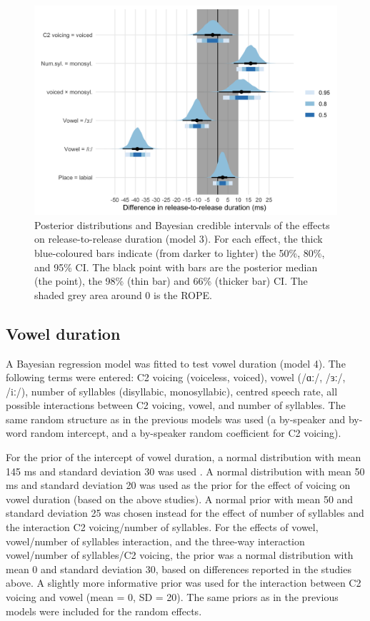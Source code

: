 \documentclass[12pt,a4paper,]{article}
\begin{document}
\begin{figure}
\includegraphics[width=\linewidth]{2019-english-rr_files/figure-latex/Figure1-1} \caption{Posterior distributions and Bayesian credible intervals of the effects on release-to-release duration (model 3). For each effect, the thick blue-coloured bars indicate (from darker to lighter) the 50\%, 80\%, and 95\% CI. The black point with bars are the posterior median (the point), the 98\% (thin bar) and 66\% (thicker bar) CI. The shaded grey area around 0 is the ROPE.}\label{f:Figure1}
\end{figure}

\hypertarget{vowel-duration}{%
\subsection{Vowel duration}\label{vowel-duration}}

\label{s:vow}

A Bayesian regression model was fitted to test vowel duration (model 4).
The following terms were entered: C2 voicing (voiceless, voiced), vowel
(/ɑː/, /ɜː/, /iː/), number of syllables (disyllabic, monosyllabic),
centred speech rate, all possible interactions between C2 voicing,
vowel, and number of syllables. The same random structure as in the
previous models was used (a by-speaker and by-word random intercept, and
a by-speaker random coefficient for C2 voicing).

For the prior of the intercept of vowel duration, a normal distribution
with mean 145 ms and standard deviation 30 was used
\citep{heffner1937, house1953, peterson1960, sharf1962, chen1970, klatt1973, davis1989, laeufer1992, ko2018}.
A normal distribution with mean 50 ms and standard deviation 20 was used
as the prior for the effect of voicing on vowel duration (based on the
above studies). A normal prior with mean 50 and standard deviation 25
was chosen instead for the effect of number of syllables and the
interaction C2 voicing/number of syllables. For the effects of vowel,
vowel/number of syllables interaction, and the three-way interaction
vowel/number of syllables/C2 voicing, the prior was a normal
distribution with mean 0 and standard deviation 30, based on differences
reported in the studies above. A slightly more informative prior was
used for the interaction between C2 voicing and vowel (mean = 0, SD =
20). The same priors as in the previous models were included for the
random effects.
\end{document}
